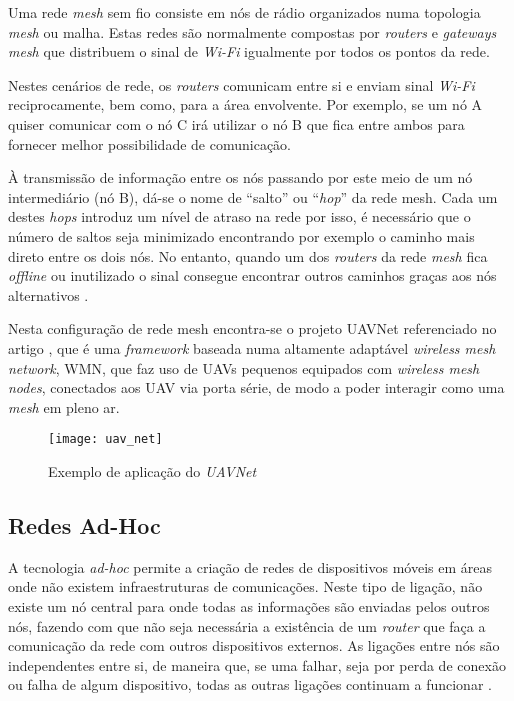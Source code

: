 Uma rede \textit{mesh} sem fio consiste em nós de rádio organizados numa topologia \textit{mesh} ou malha. Estas redes são normalmente compostas por \textit{routers} e \textit{gateways mesh} que distribuem o sinal de \textit{Wi-Fi} igualmente por todos os pontos da rede.

Nestes cenários de rede, os \textit{routers} comunicam entre si e enviam sinal \textit{Wi-Fi} reciprocamente, bem como, para a área envolvente. Por exemplo, se um nó A quiser comunicar com o nó C irá utilizar o nó B que fica entre ambos para fornecer melhor possibilidade de comunicação. 

À transmissão de informação entre os nós passando por este meio de um nó intermediário (nó B), dá-se o nome de “salto” ou “\textit{hop}” da rede mesh. Cada um destes \textit{hops} introduz um nível de atraso na rede por isso, é necessário que o número de saltos seja minimizado encontrando por exemplo o caminho mais direto entre os dois nós. No entanto, quando um dos \textit{routers} da rede \textit{mesh} fica \textit{offline} ou inutilizado o sinal consegue encontrar outros caminhos graças aos nós alternativos \cite{NetSpot}.

Nesta configuração de rede mesh encontra-se o projeto UAVNet referenciado no artigo \cite{Morgenthaler2012a}, que é uma \textit{framework} baseada numa altamente adaptável \textit{wireless mesh network}, WMN, que faz uso de UAVs pequenos equipados com \textit{wireless mesh nodes}, conectados aos UAV via porta série, de modo a poder interagir como uma \textit{mesh} em pleno ar.

\begin{figure}[H]
\centering
\texttt{[image: uav\_net]}
\caption{Exemplo de aplicação do \textit{UAVNet} \label{fig:uav_net} }\cite{Morgenthaler2012a}
\end{figure}

\subsection{Redes Ad-Hoc}

A tecnologia \textit{ad-hoc} permite a criação de redes de dispositivos móveis em áreas onde não existem infraestruturas de comunicações. Neste tipo de ligação, não existe um nó central para onde todas as informações são enviadas pelos outros nós, fazendo com que não seja necessária a existência de um \textit{router} que faça a comunicação da rede com outros dispositivos externos. As ligações entre nós são independentes entre si, de maneira que, se uma falhar, seja por perda de conexão ou falha de algum dispositivo, todas as outras ligações continuam a funcionar \cite{DalloraMoraes2007}.

